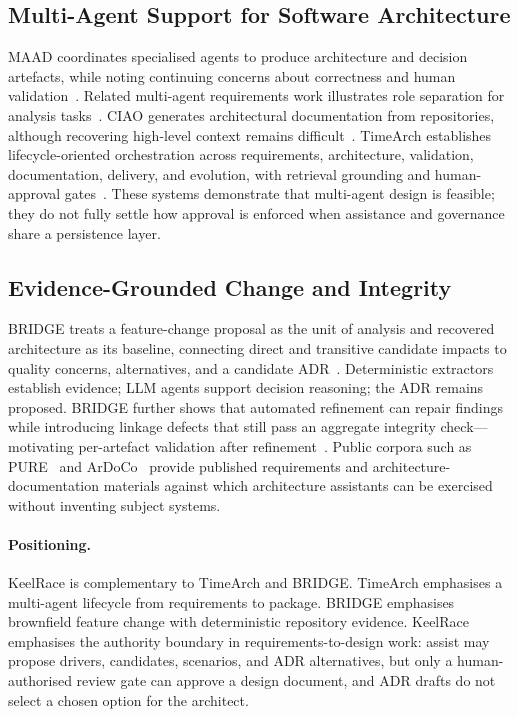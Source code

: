 \documentclass[conference]{IEEEtran}
\begin{document}
\subsection{Multi-Agent Support for Software Architecture}
MAAD coordinates specialised agents to produce architecture and decision artefacts, while noting continuing concerns about correctness and human validation~\cite{li2025maad}.
Related multi-agent requirements work illustrates role separation for analysis tasks~\cite{sami2025multiagent}.
CIAO generates architectural documentation from repositories, although recovering high-level context remains difficult~\cite{ciao2026}.
TimeArch establishes lifecycle-oriented orchestration across requirements, architecture, validation, documentation, delivery, and evolution, with retrieval grounding and human-approval gates~\cite{waseem2026timearch}.
These systems demonstrate that multi-agent design is feasible; they do not fully settle how approval is enforced when assistance and governance share a persistence layer.

\subsection{Evidence-Grounded Change and Integrity}
BRIDGE treats a feature-change proposal as the unit of analysis and recovered architecture as its baseline, connecting direct and transitive candidate impacts to quality concerns, alternatives, and a candidate ADR~\cite{waseem2026bridge}.
Deterministic extractors establish evidence; LLM agents support decision reasoning; the ADR remains proposed.
BRIDGE further shows that automated refinement can repair findings while introducing linkage defects that still pass an aggregate integrity check---motivating per-artefact validation after refinement~\cite{waseem2026bridge}.
Public corpora such as PURE~\cite{ferrari2017pure} and ArDoCo~\cite{fuchss2023ardoco} provide published requirements and architecture-documentation materials against which architecture assistants can be exercised without inventing subject systems.

\paragraph{Positioning.}
KeelRace is complementary to TimeArch and BRIDGE.
TimeArch emphasises a multi-agent lifecycle from requirements to package.
BRIDGE emphasises brownfield feature change with deterministic repository evidence.
KeelRace emphasises the authority boundary in requirements-to-design work: assist may propose drivers, candidates, scenarios, and ADR alternatives, but only a human-authorised review gate can approve a design document, and ADR drafts do not select a chosen option for the architect.
\end{document}
